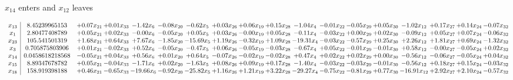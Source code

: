 \documentclass[9pt]{article}
\begin{document}
 $ x_{14} $ enters and $ x_{12} $ leaves 

 \[\begin{array}{c| c c@{\hskip 2pt} c@{\hskip 2pt} c@{\hskip 2pt} c@{\hskip 2pt} c@{\hskip 2pt} c@{\hskip 2pt} c@{\hskip 2pt} c@{\hskip 2pt} c@{\hskip 2pt} c@{\hskip 2pt} c@{\hskip 2pt} c@{\hskip 2pt} c@{\hskip 2pt} c@{\hskip 2pt} c@{\hskip 2pt} c@{\hskip 2pt} }
 x_{13}   &  8.45239965153 & +  0.07 x_{21} & +  0.01 x_{33} & -1.42 x_{6} & -0.08 x_{20} & -0.62 x_{5} & +  0.03 x_{26} & +  0.06 x_{19} & +  0.15 x_{28} & -1.04 x_{4} & -0.01 x_{22} & -0.05 x_{29} & +  0.05 x_{30} & -1.02 x_{12} & +  0.17 x_{27} & +  0.14 x_{24} & -0.07 x_{32}\\
 x_{1}   &  2.80477408789 & +  0.05 x_{21} & +  0.02 x_{33} & -0.00 x_{6} & -0.05 x_{20} & +  0.05 x_{5} & +  0.03 x_{26} & -0.00 x_{19} & +  0.05 x_{28} & -0.11 x_{4} & -0.03 x_{22} & +  0.00 x_{29} & +  0.02 x_{30} & -0.09 x_{12} & +  0.05 x_{27} & +  0.07 x_{24} & -0.06 x_{32}\\
 x_{23}   &  105.541501319 & +  1.68 x_{21} & +  0.64 x_{33} & +  7.67 x_{6} & -1.85 x_{20} & -15.69 x_{5} & +  1.19 x_{26} & -0.32 x_{19} & +  1.09 x_{28} & -19.31 x_{4} & -0.03 x_{22} & -0.57 x_{29} & +  0.25 x_{30} & +  2.26 x_{12} & +  1.81 x_{27} & +  0.69 x_{24} & -1.32 x_{32}\\
 x_{3}   &  0.705875803906 & +  0.01 x_{21} & -0.02 x_{33} & +  0.52 x_{6} & -0.05 x_{20} & -0.47 x_{5} & +  0.06 x_{26} & -0.05 x_{19} & -0.03 x_{28} & -0.67 x_{4} & +  0.05 x_{22} & -0.01 x_{29} & -0.01 x_{30} & +  0.58 x_{12} & -0.00 x_{27} & -0.05 x_{24} & +  0.02 x_{32}\\
 x_{14}   &  0.0458618218568 & -0.05 x_{21} & +  0.04 x_{33} & +  0.56 x_{6} & +  0.01 x_{20} & +  0.64 x_{5} & -0.07 x_{26} & -0.02 x_{19} & -0.02 x_{28} & +  0.47 x_{4} & +  0.02 x_{22} & +  0.02 x_{29} & +  0.00 x_{30} & -0.56 x_{12} & -0.06 x_{27} & -0.05 x_{24} & +  0.04 x_{32}\\
 x_{15}   &  8.89347678782 & +  0.05 x_{21} & -0.04 x_{33} & -1.71 x_{6} & +  0.02 x_{20} & -1.63 x_{5} & +  0.08 x_{26} & +  0.09 x_{19} & +  0.17 x_{28} & -1.40 x_{4} & -0.03 x_{22} & -0.03 x_{29} & -0.01 x_{30} & -0.56 x_{12} & +  0.18 x_{27} & +  0.15 x_{24} & -0.03 x_{32}\\
 x_{18}   &  158.919398188 & +  0.46 x_{21} & -0.65 x_{33} & -19.66 x_{6} & -0.92 x_{20} & -25.82 x_{5} & +  1.16 x_{26} & +  1.21 x_{19} & +  3.22 x_{28} & -29.27 x_{4} & -0.75 x_{22} & -0.81 x_{29} & +  0.77 x_{30} & -16.91 x_{12} & +  2.92 x_{27} & +  2.10 x_{24} & -0.57 x_{32}\\

\end{array}\]
\end{document}
